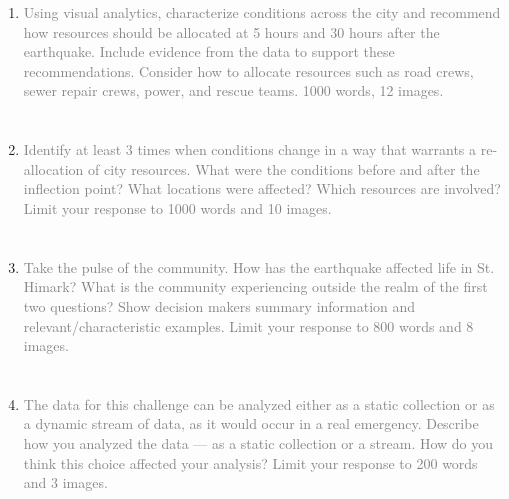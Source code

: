 \documentclass{article}
\begin{document}
\newpage
\begin{enumerate}
    \section*{\tiny} %
    \item \textcolor{gray}{Using  visual analytics, characterize conditions
        across the city and recommend how resources should be allocated at 5
        hours and 30 hours after the earthquake. Include evidence from the data
        to support these recommendations. Consider how to allocate resources
        such as road crews, sewer repair crews, power, and rescue teams. 1000
        words, 12 images.}

    
    \newpage

    \section*{\tiny} %
    \item \textcolor{gray}{Identify at least 3 times when conditions change in
        a way that warrants a re-allocation of city resources. What were the
        conditions before and after the inflection point? What locations were
        affected? Which resources are involved? Limit your response to 1000
        words and 10 images.}

    
    \newpage

    \section*{\tiny} %
    \item \textcolor{gray}{Take the pulse of the community.  How has the
        earthquake affected life in St. Himark? What is the community
        experiencing outside the realm of the first two questions? Show decision
        makers summary information and relevant/characteristic examples. Limit
        your response to 800 words and 8 images.}

    
    \newpage

    \section*{\tiny} %
    \item \textcolor{gray}{The data for this challenge can be analyzed either as
        a static collection or as a dynamic stream of data, as it would occur in
        a real emergency. Describe how you analyzed the data --- as a static
        collection or a stream. How do you think this choice affected your
        analysis? Limit your response to 200 words and 3 images.}

    
\end{enumerate}
\end{document}
